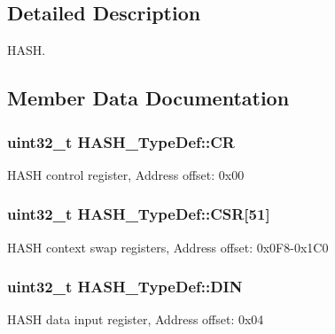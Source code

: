 \subsection{Detailed Description}
H\+A\+SH. 

\subsection{Member Data Documentation}
\subsubsection[{\texorpdfstring{CR}{CR}}]{ uint32\+\_\+t H\+A\+S\+H\+\_\+\+Type\+Def\+::\+CR}\hypertarget{struct_h_a_s_h___type_def_adba940f3265121b77f9304b1843010ea}{}\label{struct_h_a_s_h___type_def_adba940f3265121b77f9304b1843010ea}
H\+A\+SH control register, Address offset\+: 0x00 
\subsubsection[{\texorpdfstring{C\+SR}{CSR}}]{ uint32\+\_\+t H\+A\+S\+H\+\_\+\+Type\+Def\+::\+C\+SR\mbox{[}51\mbox{]}}\hypertarget{struct_h_a_s_h___type_def_af7ae6bac0500d97592f523fdbc1e3e12}{}\label{struct_h_a_s_h___type_def_af7ae6bac0500d97592f523fdbc1e3e12}
H\+A\+SH context swap registers, Address offset\+: 0x0\+F8-\/0x1\+C0 
\subsubsection[{\texorpdfstring{D\+IN}{DIN}}]{ uint32\+\_\+t H\+A\+S\+H\+\_\+\+Type\+Def\+::\+D\+IN}\hypertarget{struct_h_a_s_h___type_def_ac4f283960465f7a1d318ed66d4b88f74}{}\label{struct_h_a_s_h___type_def_ac4f283960465f7a1d318ed66d4b88f74}
H\+A\+SH data input register, Address offset\+: 0x04 
